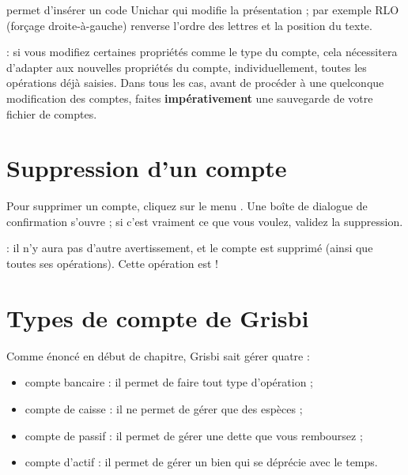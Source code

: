  permet d'insérer un code Unichar qui modifie la présentation ; par exemple RLO (forçage droite-à-gauche) renverse l'ordre des lettres et la position du texte.

 : si vous modifiez certaines propriétés comme le type du compte, cela  nécessitera d'adapter aux nouvelles propriétés du compte, individuellement, toutes les opérations déjà saisies. Dans tous les cas, avant de procéder à une quelconque modification des comptes, faites \textbf{impérativement} une sauvegarde de votre fichier de comptes.

\ifIllustration
\else
\newpage
\fi

\section{Suppression d'un compte\label{accounts-delete} }


Pour supprimer un compte, cliquez sur le menu . Une boîte de dialogue de confirmation s'ouvre ; si
c'est vraiment ce que vous voulez, validez la suppression.

 : il n'y aura pas d'autre avertissement, et le compte est supprimé (ainsi que toutes ses opérations). Cette opération est  !


\section{Types de compte de Grisbi\label{accounts-type}}


Comme énoncé en début de chapitre, Grisbi sait gérer quatre  :

\begin{itemize}
	\item compte bancaire : il permet de faire tout type d'opération ;
	\item compte de caisse : il ne permet de gérer que des espèces ;
	\item compte de passif : il permet de gérer une dette que vous remboursez ; 
	\item compte d'actif : il permet de gérer un bien qui se déprécie avec le temps. 
\end{itemize}

